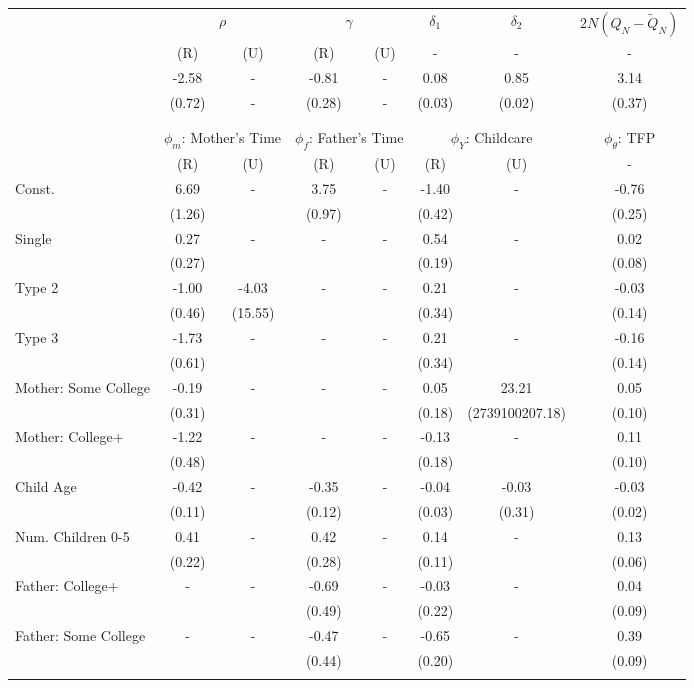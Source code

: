 \begin{tabular}{lccccccc}\toprule
 & \multicolumn{2}{c}{$\rho$} & \multicolumn{2}{c}{$\gamma$} & {$\delta_{1}$} & {$\delta_{2}$} & $2N(Q_{N} - \tilde{Q}_{N})$ \\
 & (R) & (U) & (R) & (U) & - & - & - \\\cmidrule(r){2-3}\cmidrule(r){4-5}\cmidrule(r){6-6}\cmidrule(r){7-7}\cmidrule(r){8-8}
&-2.58& - &-0.81& - &0.08&0.85&3.14\\
&(0.72)& - &(0.28)& - &(0.03)&(0.02)&(0.37)\\
\\
&&&&&&&\\
 & \multicolumn{2}{c}{$\phi_{m}$: Mother's Time} & \multicolumn{2}{c}{$\phi_{f}$: Father's Time} & \multicolumn{2}{c}{$\phi_{Y}$: Childcare} &{$\phi_{\theta}$: TFP} \\
 & (R) & (U) & (R) & (U) & (R) & (U) & -  \\\cmidrule(r){2-3}\cmidrule(r){4-5}\cmidrule(r){6-7}\cmidrule(r){8-8}
Const.&6.69& -&3.75& -&-1.40& -&-0.76\\
&(1.26)&&(0.97)&&(0.42)&&(0.25)\\
Single&0.27& -& - & -&0.54& -&0.02\\
&(0.27)& & &&(0.19)&&(0.08)\\
Type 2&-1.00&-4.03& - & -&0.21& -&-0.03\\
&(0.46)&(15.55) & &&(0.34)&&(0.14)\\
Type 3&-1.73& -& - & -&0.21& -&-0.16\\
&(0.61)& & &&(0.34)&&(0.14)\\
Mother: Some College&-0.19& -& - & -&0.05&23.21&0.05\\
&(0.31)& & &&(0.18)&(2739100207.18)&(0.10)\\
Mother: College+&-1.22& -& - & -&-0.13& -&0.11\\
&(0.48)& & &&(0.18)&&(0.10)\\
Child Age&-0.42& -&-0.35& -&-0.04&-0.03&-0.03\\
&(0.11)&&(0.12)&&(0.03)&(0.31)&(0.02)\\
Num. Children 0-5&0.41& -&0.42& -&0.14& -&0.13\\
&(0.22)&&(0.28)&&(0.11)&&(0.06)\\
Father: College+& - & -&-0.69& -&-0.03& -&0.04\\
 & &&(0.49)&&(0.22)&&(0.09)\\
Father: Some College& - & -&-0.47& -&-0.65& -&0.39\\
 & &&(0.44)&&(0.20)&&(0.09)\\
\\
\bottomrule\end{tabular}
